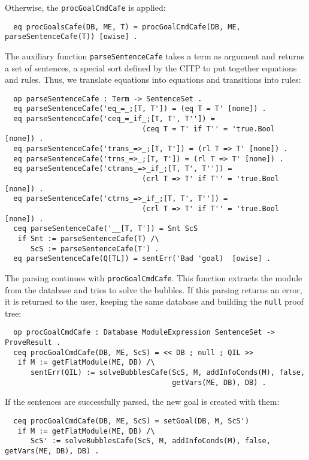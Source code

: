 Otherwise, the \texttt{procGoalCmdCafe} is applied:

{\codesize
\begin{verbatim}
  eq procGoalsCafe(DB, ME, T) = procGoalCmdCafe(DB, ME, parseSentenceCafe(T)) [owise] .
\end{verbatim}
}

The auxiliary function \verb"parseSentenceCafe" takes a term as argument and returns
a set of sentences, a special sort defined by the CITP to put together equations and
rules. Thus, we translate equations into equations and transitions into rules:

{\codesize
\begin{verbatim}
  op parseSentenceCafe : Term -> SentenceSet .
  eq parseSentenceCafe('eq_=_;[T, T']) = (eq T = T' [none]) .
  eq parseSentenceCafe('ceq_=_if_;[T, T', T'']) =
                                (ceq T = T' if T'' = 'true.Bool [none]) .
  eq parseSentenceCafe('trans_=>_;[T, T']) = (rl T => T' [none]) .
  eq parseSentenceCafe('trns_=>_;[T, T']) = (rl T => T' [none]) .
  eq parseSentenceCafe('ctrans_=>_if_;[T, T', T'']) =
                                (crl T => T' if T'' = 'true.Bool [none]) .
  eq parseSentenceCafe('ctrns_=>_if_;[T, T', T'']) =
                                (crl T => T' if T'' = 'true.Bool [none]) .
  ceq parseSentenceCafe('__[T, T']) = Snt ScS
   if Snt := parseSentenceCafe(T) /\
      ScS := parseSentenceCafe(T') .
  eq parseSentenceCafe(Q[TL]) = sentErr('Bad 'goal)  [owise] .
\end{verbatim}
}

The parsing continues with \verb"procGoalCmdCafe". This function extracts the module
from the database and tries to solve the bubbles. If this parsing returns an error,
it is returned to the user, keeping the same database and building the \verb"null"
proof tree:

{\codesize
\begin{verbatim}
  op procGoalCmdCafe : Database ModuleExpression SentenceSet -> ProveResult .
  ceq procGoalCmdCafe(DB, ME, ScS) = << DB ; null ; QIL >>
   if M := getFlatModule(ME, DB) /\
      sentErr(QIL) := solveBubblesCafe(ScS, M, addInfoConds(M), false,
                                       getVars(ME, DB), DB) .
\end{verbatim}
}

If the sentences are successfully parsed, the new goal is created with them:

{\codesize
\begin{verbatim}
  ceq procGoalCmdCafe(DB, ME, ScS) = setGoal(DB, M, ScS')
   if M := getFlatModule(ME, DB) /\
      ScS' := solveBubblesCafe(ScS, M, addInfoConds(M), false, getVars(ME, DB), DB) .
\end{verbatim}
}

